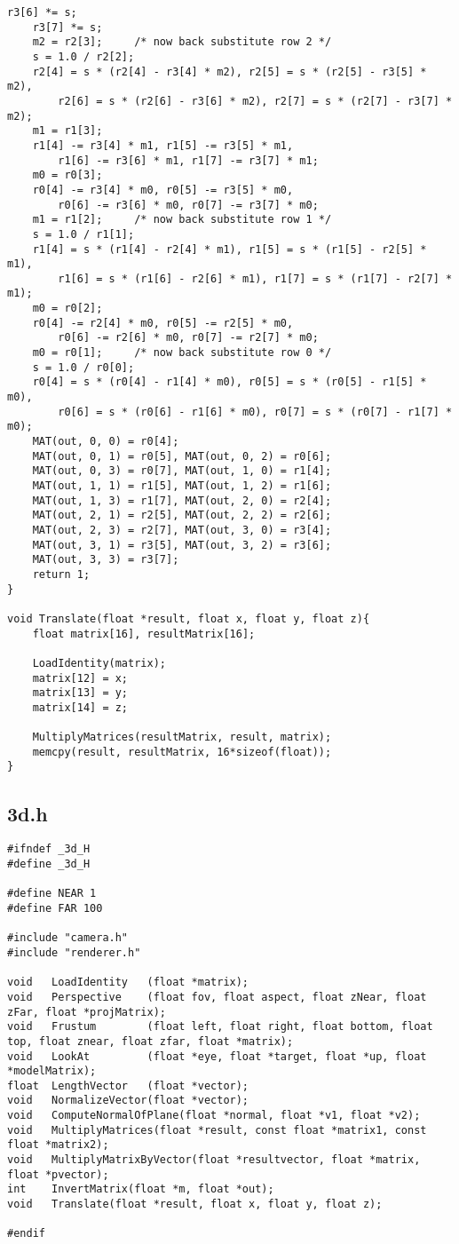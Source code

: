 \documentclass[]{article}
\begin{document}
\begin{Verbatim}[fontsize= \footnotesize, tabsize=4]
	r3[6] *= s;
	r3[7] *= s;
	m2 = r2[3];     /* now back substitute row 2 */
	s = 1.0 / r2[2];
	r2[4] = s * (r2[4] - r3[4] * m2), r2[5] = s * (r2[5] - r3[5] * m2),
		r2[6] = s * (r2[6] - r3[6] * m2), r2[7] = s * (r2[7] - r3[7] * m2);
	m1 = r1[3];
	r1[4] -= r3[4] * m1, r1[5] -= r3[5] * m1,
		r1[6] -= r3[6] * m1, r1[7] -= r3[7] * m1;
	m0 = r0[3];
	r0[4] -= r3[4] * m0, r0[5] -= r3[5] * m0,
		r0[6] -= r3[6] * m0, r0[7] -= r3[7] * m0;
	m1 = r1[2];     /* now back substitute row 1 */
	s = 1.0 / r1[1];
	r1[4] = s * (r1[4] - r2[4] * m1), r1[5] = s * (r1[5] - r2[5] * m1),
		r1[6] = s * (r1[6] - r2[6] * m1), r1[7] = s * (r1[7] - r2[7] * m1);
	m0 = r0[2];
	r0[4] -= r2[4] * m0, r0[5] -= r2[5] * m0,
		r0[6] -= r2[6] * m0, r0[7] -= r2[7] * m0;
	m0 = r0[1];     /* now back substitute row 0 */
	s = 1.0 / r0[0];
	r0[4] = s * (r0[4] - r1[4] * m0), r0[5] = s * (r0[5] - r1[5] * m0),
		r0[6] = s * (r0[6] - r1[6] * m0), r0[7] = s * (r0[7] - r1[7] * m0);
	MAT(out, 0, 0) = r0[4];
	MAT(out, 0, 1) = r0[5], MAT(out, 0, 2) = r0[6];
	MAT(out, 0, 3) = r0[7], MAT(out, 1, 0) = r1[4];
	MAT(out, 1, 1) = r1[5], MAT(out, 1, 2) = r1[6];
	MAT(out, 1, 3) = r1[7], MAT(out, 2, 0) = r2[4];
	MAT(out, 2, 1) = r2[5], MAT(out, 2, 2) = r2[6];
	MAT(out, 2, 3) = r2[7], MAT(out, 3, 0) = r3[4];
	MAT(out, 3, 1) = r3[5], MAT(out, 3, 2) = r3[6];
	MAT(out, 3, 3) = r3[7];
	return 1;
}

void Translate(float *result, float x, float y, float z){
	float matrix[16], resultMatrix[16];

	LoadIdentity(matrix);
	matrix[12] = x;
	matrix[13] = y;
	matrix[14] = z;

	MultiplyMatrices(resultMatrix, result, matrix);
	memcpy(result, resultMatrix, 16*sizeof(float));
}

\end{Verbatim}

\subsection{3d.h}
\begin{Verbatim}[fontsize= \footnotesize, tabsize=4]
#ifndef _3d_H
#define _3d_H

#define NEAR 1
#define FAR 100

#include "camera.h"
#include "renderer.h"

void   LoadIdentity   (float *matrix);
void   Perspective    (float fov, float aspect, float zNear, float zFar, float *projMatrix);
void   Frustum        (float left, float right, float bottom, float top, float znear, float zfar, float *matrix);
void   LookAt         (float *eye, float *target, float *up, float *modelMatrix);
float  LengthVector   (float *vector);
void   NormalizeVector(float *vector);
void   ComputeNormalOfPlane(float *normal, float *v1, float *v2);
void   MultiplyMatrices(float *result, const float *matrix1, const float *matrix2);
void   MultiplyMatrixByVector(float *resultvector, float *matrix, float *pvector);
int    InvertMatrix(float *m, float *out);
void   Translate(float *result, float x, float y, float z);

#endif
\end{Verbatim}
\end{document}
